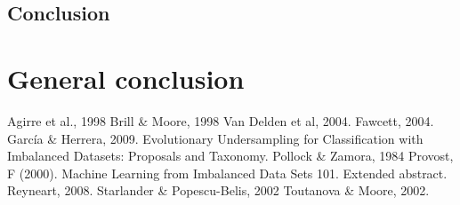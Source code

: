 \documentclass[12pt]{article}
\let\stdsection\section
\renewcommand\section{\newpage\stdsection}
\begin{document}
\subsection{Conclusion}

\section{General conclusion}%


\begin{thebibliography}{99}

Agirre et al., 1998
Brill \& Moore, 1998
Van Delden et al, 2004.
Fawcett, 2004.
García \& Herrera, 2009. Evolutionary Undersampling for Classification with Imbalanced Datasets: Proposals and Taxonomy.
Pollock \& Zamora, 1984
Provost, F (2000). Machine Learning from Imbalanced Data Sets 101. Extended abstract. 
Reyneart, 2008.
Starlander \& Popescu-Belis, 2002
Toutanova \& Moore, 2002.

\end{thebibliography}

\end{document}

